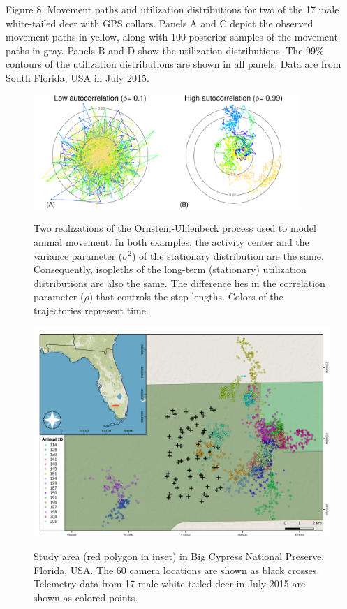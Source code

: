 \documentclass[12pt]{article}
\begin{document}
Figure 8. Movement paths and utilization distributions for two of the
    17 male white-tailed deer with GPS collars. Panels A and C depict the observed
    movement paths in yellow, along with 100 posterior samples of the
    movement paths in gray. Panels B and D show the
    utilization distributions. The 99\% contours of the utilization
    distributions are shown in all panels. Data are from South
    Florida, USA in July 2015.    
    
\clearpage

\begin{figure}[h!]
  \centering
  \includegraphics[width=0.9\textwidth]{figs/OU_low_high_contours} \\
  \caption{Two realizations of the Ornstein-Uhlenbeck process used to
    model animal movement. In both examples, the activity center and
    the variance parameter ($\sigma^2$) of the stationary distribution
    are the same. Consequently, isopleths of the long-term
    (stationary) utilization distributions are also the same. The
    difference lies in the correlation parameter ($\rho$) that
    controls the step lengths. Colors of the trajectories represent
    time.}   
  \label{fig:ou-concept}
\end{figure}


\clearpage


\begin{figure}[h!]
  \centering
  \includegraphics[width=\textwidth]{figs/StudyArea_6w_400dpi} \\
  \caption{Study area (red polygon in inset) in Big Cypress National Preserve, 
    Florida, USA. The 60 camera locations are shown as black
    crosses. Telemetry data from 17 male white-tailed deer in July
    2015 are shown as colored points.}
  \label{fig:study-area}
\end{figure}
\end{document}
